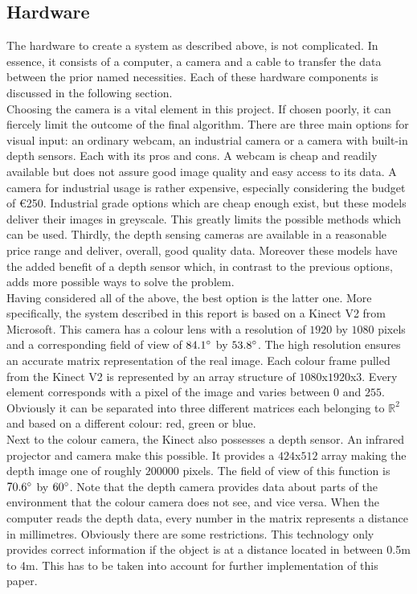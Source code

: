 \documentclass{article}
\begin{document}
\subsection{Hardware}
The hardware to create a system as described above, is not complicated. In essence, it consists of a computer, a camera and a cable to transfer the data between the prior named necessities. Each of these hardware components is discussed in the following section.\\
Choosing the camera is a vital element in this project. If chosen poorly, it can fiercely limit the outcome of the final algorithm. There are three main options for visual input: an ordinary webcam, an industrial camera or a camera with built-in depth sensors. Each with its pros and cons. A webcam is cheap and readily available but does not assure good image quality and easy access to its data. A camera for industrial usage is rather expensive, especially considering the budget of \euro 250. Industrial grade options which are cheap enough exist, but these models deliver their images in greyscale. This greatly limits the possible methods which can be used. Thirdly, the depth sensing cameras are available in a reasonable price range and deliver, overall, good quality data. Moreover these models have the added benefit of a depth sensor which, in contrast to the previous options, adds more possible ways to solve the problem.\\
Having considered all of the above, the best option is the latter one. More specifically, the system described in this report is based on a Kinect V2 from Microsoft. This camera has a colour lens with a resolution of $1920$ by $1080$ pixels and a corresponding field of view of $84.1\degree$ by $53.8\degree$\cite{kinect_specifications}. The high resolution ensures an accurate matrix representation of the real image. Each colour frame pulled from the Kinect V2 is represented by an array structure of $1080$x$1920$x$3$. Every element corresponds with a pixel of the image and varies between $0$ and $255$. Obviously it can be separated into three different matrices each belonging to $\mathbb{R}^{2}$ and based on a different colour: red, green or blue.\\ Next to the colour camera, the Kinect also possesses a depth sensor. An infrared projector and camera make this possible\cite{kinect_v2}. It provides a $424$x$512$ array making the depth image one of roughly $200 000$ pixels. The field of view of this function is $70.6\degree$ by $60\degree$. Note that the depth camera provides data about parts of the environment that the colour camera does not see, and vice versa. When the computer reads the depth data, every number in the matrix represents a distance in millimetres. Obviously there are some restrictions. This technology only provides correct information if the object is at a distance located in between 0.5m to 4m. This has to be taken into account for further implementation of this paper.\\
\end{document}
